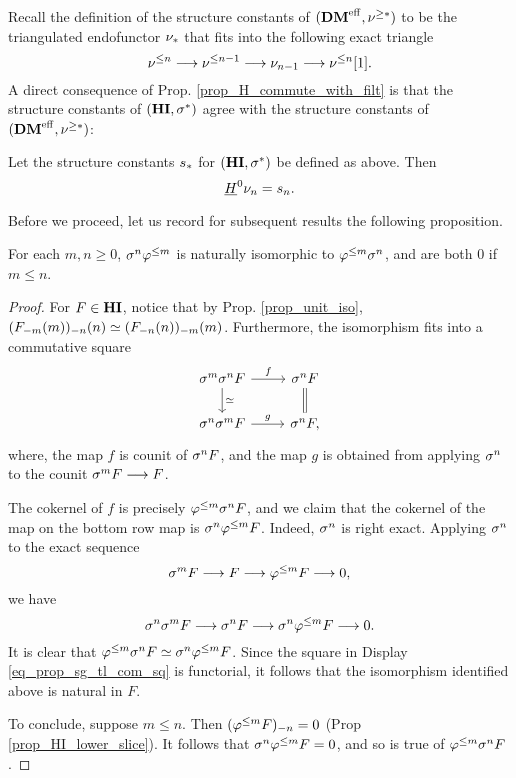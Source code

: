 Recall the definition of the structure constants of $(\DMeff, 
\sgDM{*})$ to be the triangulated endofunctor $\sliceDM{*}$ that
fits into the following exact triangle
\[
\slDM{n} \to \slDM{n - 1} \to \sliceDM{n - 1} \to \slDM{n}[1].
\]
A direct consequence of Prop. \ref{prop_H_commute_with_filt} is 
that the structure constants of $(\HI, \sgHI{*})$ agree with the 
structure constants of $(\DMeff, \sgDM{*})$:

\begin{cor}\label{cor_H_commute_with_slice}
Let the structure constants $\slice{*}$ for $(\HI, \sgHI{*})$ be 
defined as above. Then
\[
\sheaf{H}^0 \sliceDM{n} = \slice{n}.
\]
\end{cor}

Before we proceed, let us record for subsequent results the 
following proposition.

\begin{prop}\label{prop_sg_tl_commute}
For each $m, n \geq 0$, $\sgHI{n} \tlHI{m}$ is naturally
isomorphic to $\tlHI{m} \sgHI{n}$, and are both 0 if $m \leq n$.
\end{prop}
\begin{proof}
For $F \in \HI$, notice that by Prop. \ref{prop_unit_iso}, 
$\LHI[n]{\RHI[n]{(\LHI[m]{\RHI[m]{F}})}} \simeq
\LHI[m]{\RHI[m]{(\LHI[n]{\RHI[n]{F}})}}$. Furthermore, the 
isomorphism fits into a commutative square
\begin{equation}\label{eq_prop_sg_tl_com_sq}
\begin{tikzcd}
\sgHI{m}\sgHI{n} F \arrow{r}{f} \arrow{d}{\simeq} & 
\sgHI{n} F \arrow[equal]{d} \\
\sgHI{n}\sgHI{m} F \arrow{r}{g} &
\sgHI{n} F,
\end{tikzcd}
\end{equation}
where, the map $f$ is counit of $\sgHI{n} F$, and the map $g$
is obtained from applying $\sgHI{n}$ to the counit $\sgHI{m} F 
\to F$.

The cokernel of $f$ is precisely $\tlHI{m} \sgHI{n} F$, and we 
claim that the cokernel of the map on the bottom row map is 
$\sgHI{n} \tlHI{m} F$. Indeed, $\sgHI{n}$ is right exact. Applying 
$\sgHI{n}$ to the exact sequence
\[
\sgHI{m} F \to F \to \tlHI{m} F \to 0,
\]
we have
\[
\sgHI{n} \sgHI{m} F \to \sgHI{n} F \to \sgHI{n} \tlHI{m} F \to 0.
\]
It is clear that $\tlHI{m} \sgHI{n} F \simeq \sgHI{n} \tlHI{m} F$.
Since the square in Display \ref{eq_prop_sg_tl_com_sq} is 
functorial, it follows that the isomorphism identified above is
natural in $F$.

To conclude, suppose $m \leq n$. Then $\RHI[n]{(\tlHI{m} F)} = 0$
(Prop \ref{prop_HI_lower_slice}). It follows that $\sgHI{n} 
\tlHI{m} F = 0$, and so is true of $\tlHI{m} \sgHI{n} F$.
\end{proof}

